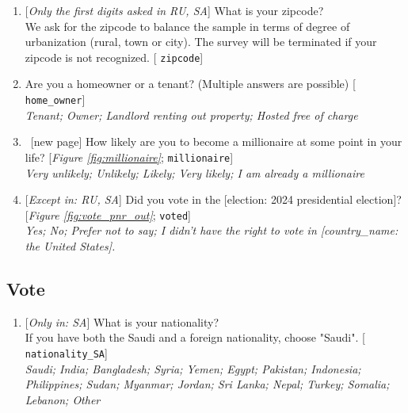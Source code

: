 \documentclass[12pt,english]{article}
\begin{document}
\begin{bibunit}
\begin{enumerate}[resume]
\item  \label{q:zipcode} [\textit{Only the first digits asked in RU, SA}] What is your zipcode?\\
We ask for the zipcode to balance the sample in terms of degree of urbanization (rural, town or city). The survey will be terminated if your zipcode is not recognized. [%
\verb|zipcode|]


\item  \label{q:home} Are you a homeowner or a tenant? (Multiple answers are possible) [%
\verb|home_owner|]
  \\ \textit{Tenant; Owner; Landlord renting out property; Hosted free of charge}

\item ~[new page] \label{q:millionaire} How likely are you to become a millionaire at some point in your life? [\textit{Figure \ref{fig:millionaire}}; 
\verb|millionaire|]
  \\ \textit{Very unlikely; Unlikely; Likely; Very likely; I am already a millionaire}%

\item  \label{q:voted} [\textit{Except in: RU, SA}] Did you vote in the [election: 2024 presidential election]? [\textit{Figure%
\ref{fig:vote_pnr_out}}; 
\verb|voted|]
  \\ \textit{Yes; No; Prefer not to say; I didn't have the right to vote in [country\_name: the United States].}

\end{enumerate} 

 \subsection*{Vote} 
 \begin{enumerate}[resume] 
\item  \label{q:nationality_SA} [\textit{Only in: SA}] What is your nationality?\\If you have both the Saudi and a foreign nationality, choose "Saudi". [%
\verb|nationality_SA|]
  \\ \textit{Saudi; India; Bangladesh; Syria; Yemen; Egypt; Pakistan; Indonesia; Philippines; Sudan; Myanmar; Jordan; Sri Lanka; Nepal; Turkey; Somalia; Lebanon; Other}


\end{enumerate}
\end{bibunit}
\end{document}
